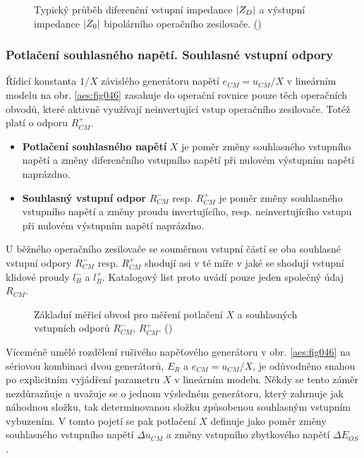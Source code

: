         \begin{figure}[ht!] %
          \centering
          \caption{Typický průběh diferenční vstupní impedance \(\left\lvert Z_D\right\rvert\) a výstupní impedance 
                  \(\left\lvert Z_0\right\rvert\) bipolárního operačního zesilovače. (\cite[s.~26]{Dostal})}
          \label{aes:fig054}
        \end{figure} 
        
      \subsubsection{Potlačení souhlasného napětí. Souhlasné vstupní odpory}\label{aesIchIIIsecIIssecVI}
        Řídicí konstanta \(1/X\) závislého generátoru napětí \(e_{CM} = u_{CM}/X\) v lineárním
        modelu na obr. \ref{aes:fig046} zasahuje do operační rovnice pouze těch operačních obvodů,
        které aktivně využívají neinvertující vstup operačního zesilovače. Totéž platí o odporu
        \(R_{CM}^+\).
        \begin{itemize}[noitemsep]
          \item \textbf{Potlačení souhlasného napětí} \(X\) je poměr změny souhlasného vstupního
                napětí a změny diferenčního vstupního napětí při nulovém výstupním napětí naprázdno.
          \item \textbf{Souhlasný vstupní odpor} \(R_{CM}^-\) resp. \(R_{CM}^+\) je poměr změny
                souhlasného vstupního napětí a změny proudu invertujícího, resp. neinvertujícího
                vstupu při nulovém výstupním napětí naprázdno.          
        \end{itemize}

        U běžného operačního zesilovače se souměrnou vstupní částí se oba souhlasné vstupní odpory
        \(R_{CM}^-\) resp. \(R_{CM}^+\) shodují asi v té míře v jaké se shodují vstupní klidové
        proudy \(l_B^-\) a \(l_B^+\). Katalogový list proto uvádí pouze jeden společný údaj
        \(R_{CM}\).

        \begin{figure}[ht!] %
          \centering
          \caption{Základní měřicí obvod pro měření potlačení \(X\) a souhlasných vstupních odporů
                   \(R_{CM}^-\), \(R_{CM}^+\). (\cite[s.~27]{Dostal})}
          \label{aes:fig055}
        \end{figure} 

        Víceméně umělé rozdělení rušivého napěťového generátoru v obr. \ref{aes:fig046} na sériovou
        kombinaci dvou generátorů, \(E_R\) a \(e_{CM} = u_{CM}/X\), je odůvodněno snahou po
        explicitním vyjádření parametru \(X\) v lineárním modelu. Někdy se tento záměr nezdůrazňuje
        a uvažuje se o jednom výsledném generátoru, který zahrnuje jak náhodnou složku, tak
        determinovanou složku způsobenou souhlasným vstupním vybuzením. V tomto pojetí se pak
        potlačení \(X\) definuje jako poměr změny souhlasného vstupního napětí \(\Delta u_{CM}\) a
        změny vstupního zbytkového napětí \(\Delta E_{OS}\).

